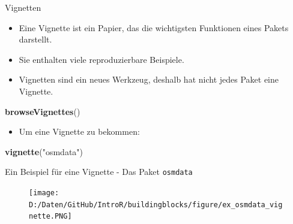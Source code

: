 \documentclass[ignorenonframetext,]{beamer}
\newenvironment{Shaded}{\begin{snugshade}}{\end{snugshade}}
\newcommand{\KeywordTok}[1]{\textcolor[rgb]{0.26,0.66,0.93}{\textbf{#1}}}
\newcommand{\StringTok}[1]{\textcolor[rgb]{0.02,0.61,0.04}{#1}}
\newcommand{\NormalTok}[1]{\textcolor[rgb]{0.74,0.68,0.62}{#1}}
\providecommand{\tightlist}{%
  \setlength{\itemsep}{0pt}\setlength{\parskip}{0pt}}
\begin{document}
\begin{frame}[fragile]{Vignetten}

\begin{itemize}
\tightlist
\item
  Eine Vignette ist ein Papier, das die wichtigsten Funktionen eines
  Pakets darstellt.
\item
  Sie enthalten viele reproduzierbare Beispiele.
\item
  Vignetten sind ein neues Werkzeug, deshalb hat nicht jedes Paket eine
  Vignette.
\end{itemize}

\begin{Shaded}
\begin{Highlighting}[]
\KeywordTok{browseVignettes}\NormalTok{()}
\end{Highlighting}
\end{Shaded}

\begin{itemize}
\tightlist
\item
  Um eine Vignette zu bekommen:
\end{itemize}

\begin{Shaded}
\begin{Highlighting}[]
\KeywordTok{vignette}\NormalTok{(}\StringTok{"osmdata"}\NormalTok{)}
\end{Highlighting}
\end{Shaded}

\end{frame}

\begin{frame}{Ein Beispiel für eine Vignette - Das Paket
\texttt{osmdata}}

\begin{figure}
\centering
\texttt{[image: D:/Daten/GitHub/IntroR/buildingblocks/figure/ex\_osmdata\_vignette.PNG]}
\caption{}
\end{figure}

\end{frame}
\end{document}
